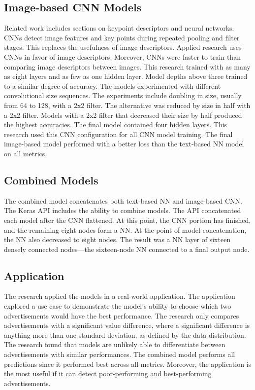 \documentclass{article}
\begin{document}
\subsection{Image-based CNN Models}
Related work includes sections on keypoint descriptors and neural networks. CNNs detect image features and key points during repeated pooling and filter stages.  This replaces the usefulness of image descriptors. Applied research uses CNNs in favor of image descriptors. Moreover, CNNs were faster to train than comparing image descriptors between images. This research trained with as many as eight layers and as few as one hidden layer. Model depths above three trained to a similar degree of accuracy. The models experimented with different convolutional size sequences. The experiments include doubling in size, usually from 64 to 128, with a 2x2 filter. The alternative was reduced by size in half with a 2x2 filter.  Models with a 2x2 filter that decreased their size by half produced the highest accuracies. The final model contained four hidden layers. This research used this CNN configuration for all CNN model training. The final image-based model performed with a better loss than the text-based NN model on all metrics.   

\subsection{Combined Models}
The combined model concatenates both text-based NN and image-based CNN. The Keras API includes the ability to combine models. The API concatenated each model after the CNN flattened. At this point, the CNN portion has finished, and the remaining eight nodes form a NN. At the point of model concatenation, the NN also decreased to eight nodes. The result was a NN layer of sixteen densely connected nodes—the sixteen-node NN connected to a final output node.    
\subsection{Application}
The research applied the models in a real-world application. The application explored a use case to demonstrate the model's ability to choose which two advertisements would have the best performance. The research only compares advertisements with a significant value difference, where a significant difference is anything more than one standard deviation, as defined by the data distribution. The research found that models are unlikely able to differentiate between advertisements with similar performances. The combined model performs all predictions since it performed best across all metrics. Moreover, the application is the most useful if it can detect poor-performing and best-performing advertisements.  
\end{document}
